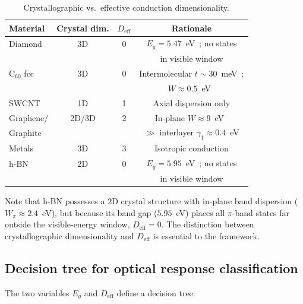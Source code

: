 \documentclass[twocolumn,showpacs,preprintnumbers,amsmath,amssymb,prb]{revtex4-2}
\begin{document}
\begin{table}[h]
\caption{Crystallographic vs.\ effective conduction dimensionality.}
\label{tab:Deff}
\begin{ruledtabular}
\begin{tabular}{lccc}
  Material & Crystal dim. & $D_\mathrm{eff}$ & Rationale \\
  \hline
  Diamond      & 3D     & 0 & $E_g = 5.47$~eV~\cite{Clark1964}; no states \\
               &        &   & in visible window \\
  C$_{60}$ fcc & 3D     & 0 & Intermolecular $t \sim 30$~meV~\cite{Hebard1991}; \\
               &        &   & $W \approx 0.5$~eV~\cite{Gunnarsson1997} \\
  SWCNT        & 1D     & 1 & Axial dispersion only \\
  Graphene/    & 2D/3D  & 2 & In-plane $W \approx 9$~eV~\cite{Reich2002} \\
  \quad Graphite &      &   & $\gg$ interlayer $\gamma_1 \approx 0.4$~eV \\
  Metals       & 3D     & 3 & Isotropic conduction \\
  h-BN         & 2D     & 0 & $E_g = 5.95$~eV~\cite{Cassabois2016}; no states \\
               &        &   & in visible window \\
\end{tabular}
\end{ruledtabular}
\end{table}

Note that h-BN possesses a 2D crystal structure with in-plane band
dispersion ($W_\pi \approx 2.4$~eV), but because its band gap
($5.95$~eV) places all $\pi$-band states far outside the visible-energy
window, $D_\mathrm{eff} = 0$. The distinction between crystallographic
dimensionality and $D_\mathrm{eff}$ is essential to the framework.

\subsection{Decision tree for optical response classification}
\label{sec:tree}

The two variables $E_g$ and $D_\mathrm{eff}$ define a decision tree:
\end{document}
